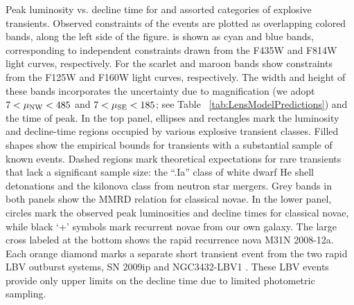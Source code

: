 \label{fig:PeakLuminosityDeclineTime}
Peak luminosity vs. decline time for \spock and assorted categories of
explosive transients.  Observed constraints of the \spock events are
plotted as overlapping colored bands, along the left side of the
figure.  \spockone is shown as cyan and blue bands, corresponding to
independent constraints drawn from the F435W and F814W light curves,
respectively.  For \spocktwo the scarlet and maroon bands show
constraints from the F125W and F160W light curves, respectively.  The
width and height of these bands incorporates the uncertainty due to
magnification (we adopt $7<\mu_{\rm NW}<485$ and $7<\mu_{\rm SE}<185$; see Table ~\ref{tab:LensModelPredictions}) and the time of peak.  In
the top panel, ellipses and rectangles mark the luminosity and
decline-time regions occupied by various explosive transient classes.
Filled shapes show the empirical bounds for transients with a
substantial sample of known events. Dashed regions mark theoretical
expectations for rare transients that lack a significant sample size:
the ``.Ia'' class of white dwarf He shell detonations and the kilonova
class from neutron star mergers.  Grey bands in both panels show the
MMRD relation for classical novae.  In the lower panel, circles mark
the observed peak luminosities and decline times for classical novae,
while black `+' symbols mark recurrent novae from our own galaxy.  The
large cross labeled at the bottom shows the rapid recurrence nova M31N
2008-12a.  Each orange diamond marks a separate short transient event
from the two rapid LBV outburst systems, SN
2009ip \citep{Pastorello:2013} and NGC3432-LBV1 \citep[a.k.a. SN
2000ch][]{Pastorello:2010}.  These LBV events provide only upper
limits on the decline time due to limited photometric sampling.
